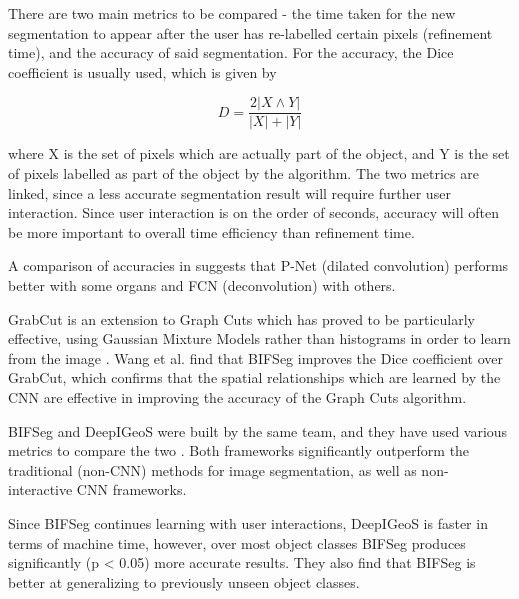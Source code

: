 There are two main metrics to be compared - the time taken for the new segmentation to appear after the user has re-labelled certain pixels (refinement time), and the accuracy of said segmentation. For the accuracy, the Dice coefficient is usually used, which is given by

\begin{equation}
D = \frac{2|X \land Y|}{|X| + |Y|}
\end{equation}

where X is the set of pixels which are actually part of the object, and Y is the set of pixels labelled as part of the object by the algorithm. The two metrics are linked, since a less accurate segmentation result will require further user interaction. Since user interaction is on the order of seconds, accuracy will often be more important to overall time efficiency than refinement time.

A comparison of accuracies in \cite{BIFSeg} suggests that P-Net (dilated convolution) performs better with some organs and FCN (deconvolution) with others. 

GrabCut is an extension to Graph Cuts which has proved to be particularly effective, using Gaussian Mixture Models rather than histograms in order to learn from the image \cite{grabCut}. Wang et al. find that BIFSeg improves the Dice coefficient over GrabCut, which confirms that the spatial relationships which are learned by the CNN are effective in improving the accuracy of the Graph Cuts algorithm.  

BIFSeg and DeepIGeoS were built by the same team, and they have used various metrics to compare the two \cite{BIFSeg}. Both frameworks significantly outperform the traditional (non-CNN) methods for image segmentation, as well as non-interactive CNN frameworks.

Since BIFSeg continues learning with user interactions, DeepIGeoS is faster in terms of machine time, however, over most object classes BIFSeg produces significantly (p < 0.05) more accurate results. They also find that BIFSeg is better at generalizing to previously unseen object classes.